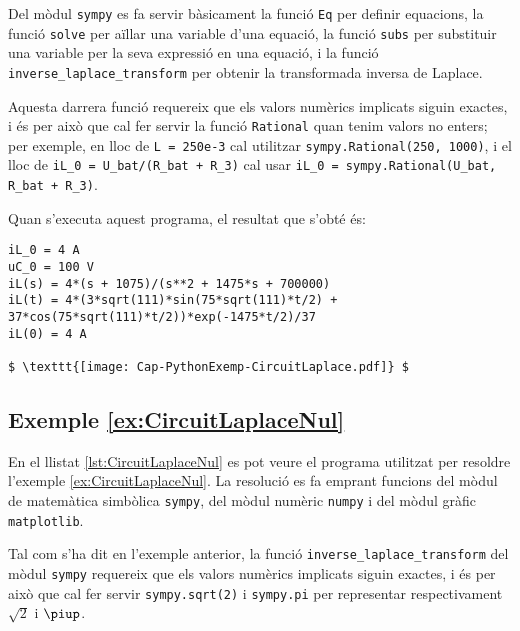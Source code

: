 Del mòdul \texttt{sympy} es fa servir bàsicament la funció \texttt{Eq} per definir equacions,  la funció \texttt{solve} per aïllar una variable d'una equació, la funció \texttt{subs} per substituir  una variable per la seva expressió en una equació, i la   funció \texttt{inverse\_laplace\_transform} per obtenir la transformada inversa de Laplace. 

Aquesta  darrera funció requereix que els valors numèrics implicats siguin exactes, i és per això que cal fer servir la funció \texttt{Rational} quan tenim valors no enters; per exemple, en lloc de \texttt{L = 250e-3} cal utilitzar \texttt{sympy.Rational(250, 1000)}, i el lloc de \texttt{iL\_0 =  U\_bat/(R\_bat + R\_3)} cal usar \texttt{iL\_0 = sympy.Rational(U\_bat, R\_bat + R\_3)}.
\pagebreak



Quan s'executa aquest programa, el resultat que s'obté és:
\lstset{
	language=,
	numbers=none,
	frame=none
}
\begin{lstlisting}[mathescape=true]
iL_0 = 4 A
uC_0 = 100 V
iL(s) = 4*(s + 1075)/(s**2 + 1475*s + 700000)
iL(t) = 4*(3*sqrt(111)*sin(75*sqrt(111)*t/2) + 37*cos(75*sqrt(111)*t/2))*exp(-1475*t/2)/37
iL(0) = 4 A

$ \texttt{[image: Cap-PythonExemp-CircuitLaplace.pdf]} $
\end{lstlisting} 



\hypertarget{exemple:CircuitLaplaceNul}{\subsection{Exemple \ref*{ex:CircuitLaplaceNul} \CircuitLaplaceNul}}

En el llistat \vref{lst:CircuitLaplaceNul} es pot veure el programa utilitzat per resoldre l'exemple \vref{ex:CircuitLaplaceNul}. La resolució es fa emprant funcions del mòdul de matemàtica simbòlica \texttt{sympy}, del mòdul numèric \texttt{numpy} i del mòdul gràfic  \texttt{matplotlib}. 

Tal com s'ha dit en l'exemple anterior, la funció \texttt{inverse\_laplace\_transform} del mòdul \texttt{sympy}  requereix que els valors numèrics implicats siguin exactes, i és per això que cal fer servir \texttt{sympy.sqrt(2)} i \texttt{sympy.pi} per representar respectivament  $\sqrt{2}$ i $\piup$.

